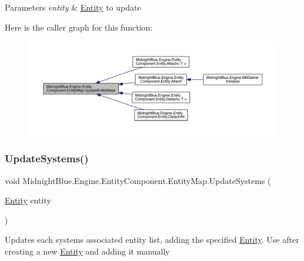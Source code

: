 \begin{DoxyParams}{Parameters}
{\em entity} & \hyperlink{class_midnight_blue_1_1_engine_1_1_entity_component_1_1_entity}{Entity} to update\\
\hline
\end{DoxyParams}
Here is the caller graph for this function\+:
\nopagebreak
\begin{figure}[H]
\begin{center}
\leavevmode
\includegraphics[width=350pt]{class_midnight_blue_1_1_engine_1_1_entity_component_1_1_entity_map_ae719ec7cdc2b4311590ca22674d47bf0_icgraph}
\end{center}
\end{figure}
\hypertarget{class_midnight_blue_1_1_engine_1_1_entity_component_1_1_entity_map_abecc0cc62b145f8d44661b56e06fb06e}{}\label{class_midnight_blue_1_1_engine_1_1_entity_component_1_1_entity_map_abecc0cc62b145f8d44661b56e06fb06e} 
\subsubsection{\texorpdfstring{Update\+Systems()}{UpdateSystems()}}
{\footnotesize\ttfamily void Midnight\+Blue.\+Engine.\+Entity\+Component.\+Entity\+Map.\+Update\+Systems (\begin{DoxyParamCaption}\item[{\hyperlink{class_midnight_blue_1_1_engine_1_1_entity_component_1_1_entity}{Entity}}]{entity }\end{DoxyParamCaption})\hspace{0.3cm}{\ttfamily [inline]}}



Updates each systems associated entity list, adding the specified \hyperlink{class_midnight_blue_1_1_engine_1_1_entity_component_1_1_entity}{Entity}. Use after creating a new \hyperlink{class_midnight_blue_1_1_engine_1_1_entity_component_1_1_entity}{Entity} and adding it manually 



